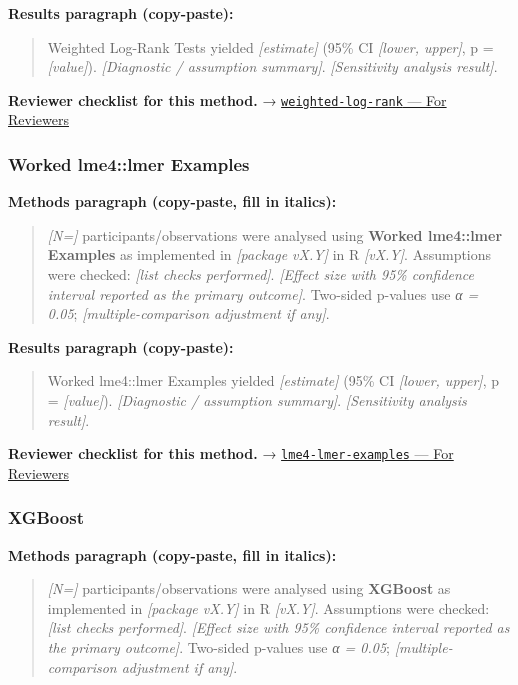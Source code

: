 \documentclass[
]{article}
\begin{document}
\textbf{Results paragraph (copy-paste):}

\begin{quote}
Weighted Log-Rank Tests yielded \emph{{[}estimate{]}} (95\% CI
\emph{{[}lower, upper{]}}, p = \emph{{[}value{]}}). \emph{{[}Diagnostic
/ assumption summary{]}}. \emph{{[}Sensitivity analysis result{]}}.
\end{quote}

\textbf{Reviewer checklist for this method.} →
\href{../chapters/11-survival/weighted-log-rank.Rmd\#for-reviewers}{\texttt{weighted-log-rank}
--- For Reviewers}

\subsubsection{Worked lme4::lmer
Examples}\label{worked-lme4lmer-examples}

\textbf{Methods paragraph (copy-paste, fill in italics):}

\begin{quote}
\emph{{[}N={]}} participants/observations were analysed using
\textbf{Worked lme4::lmer Examples} as implemented in \emph{{[}package
vX.Y{]}} in R \emph{{[}vX.Y{]}}. Assumptions were checked: \emph{{[}list
checks performed{]}}. \emph{{[}Effect size with 95\% confidence interval
reported as the primary outcome{]}}. Two-sided p-values use \emph{α =
0.05}; \emph{{[}multiple-comparison adjustment if any{]}}.
\end{quote}

\textbf{Results paragraph (copy-paste):}

\begin{quote}
Worked lme4::lmer Examples yielded \emph{{[}estimate{]}} (95\% CI
\emph{{[}lower, upper{]}}, p = \emph{{[}value{]}}). \emph{{[}Diagnostic
/ assumption summary{]}}. \emph{{[}Sensitivity analysis result{]}}.
\end{quote}

\textbf{Reviewer checklist for this method.} →
\href{../chapters/07-regression/lme4-lmer-examples.Rmd\#for-reviewers}{\texttt{lme4-lmer-examples}
--- For Reviewers}

\subsubsection{XGBoost}\label{xgboost}

\textbf{Methods paragraph (copy-paste, fill in italics):}

\begin{quote}
\emph{{[}N={]}} participants/observations were analysed using
\textbf{XGBoost} as implemented in \emph{{[}package vX.Y{]}} in R
\emph{{[}vX.Y{]}}. Assumptions were checked: \emph{{[}list checks
performed{]}}. \emph{{[}Effect size with 95\% confidence interval
reported as the primary outcome{]}}. Two-sided p-values use \emph{α =
0.05}; \emph{{[}multiple-comparison adjustment if any{]}}.
\end{quote}
\end{document}
